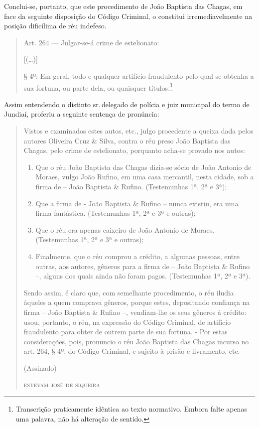 Conclui-se, portanto, que este procedimento de João Baptista das Chagas,
em face da seguinte disposição do Código Criminal, o constitui
irremediavelmente na posição dificílima de réu indefeso.

\begin{quote}
Art. 264 --- Julgar-se-á crime de estelionato:

{[}(\ldots{}){]}

§ 4º: Em geral, todo e qualquer artifício fraudulento pelo qual se
obtenha a sua fortuna, ou parte dela, ou quaisquer títulos.\footnote{Transcrição
  praticamente idêntica ao texto normativo. Embora falte apenas uma
  palavra, não há alteração de sentido.}
\end{quote}

Assim entendendo o distinto sr.\,delegado de polícia e juiz municipal do
termo de Jundiaí, proferiu a seguinte sentença de pronúncia:

\begin{quote}
Vistos e examinados estes autos, etc., julgo procedente a queixa dada
pelos autores Oliveira Cruz \& Silva, contra o réu preso João Baptista
das Chagas, pelo crime de estelionato, porquanto acha-se provado nos
autos:

\begin{enumerate}[label=\arabic*º]
\item Que o réu João Baptista das Chagas dizia-se sócio de João Antonio de
Moraes, vulgo João Rufino, em uma casa mercantil, nesta cidade, sob a
firma de -- João Baptista \& Rufino. (Testemunhas 1ª, 2ª e 3ª);

\item Que a firma de - João Baptista \& Rufino -- nunca existiu, era uma
firma fantástica. (Testemunhas 1ª, 2ª e 3ª e outras);

\item Que o réu era apenas caixeiro de João Antonio de Moraes.
(Testemunhas 1ª, 2ª e 3ª e outras);

\item Finalmente, que o réu comprou a crédito, a algumas pessoas, entre
outras, aos autores, gêneros para a firma de -- João Baptista \& Rufino
--, alguns dos quais ainda não foram pagos. (Testemunhas 1ª, 2ª e 3ª).
\end{enumerate}

Sendo assim, é claro que, com semelhante procedimento, o réu iludia
àqueles a quem comprava gêneros, porque estes, depositando confiança na
firma -- João Baptista \& Rufino --, vendiam-lhe os seus gêneros à
crédito: usou, portanto, o réu, na expressão do Código Criminal, de
artifício fraudulento para obter de outrem parte de sua fortuna. - Por
estas considerações, pois, pronuncio o réu João Baptista das Chagas
incurso no art. 264, § 4º, do Código Criminal, e sujeito à prisão e
livramento, etc.

\begin{flushright}
(Assinado)

\textsc{estevam josé de siqueira}
\end{flushright}
\end{quote}

